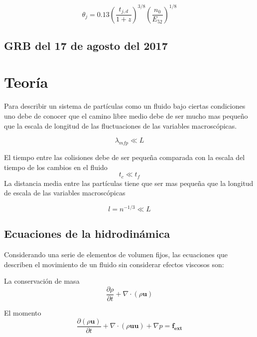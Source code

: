 \documentclass[12pt,a4paper]{book}
\begin{document}
\begin{equation}
\theta_j = 0.13 \left( \frac{t_{j,d}}{1+z} \right)^{3/8}
\left(\frac{n_0}{E_{52}} \right)^{1/8}
\end{equation}

\section{GRB del 17 de agosto del 2017}
%
\chapter{Teoría}
Para describir un sistema de partículas como un fluido bajo ciertas condiciones uno debe de conocer que el camino libre medio debe de ser mucho mas pequeño que la escala de longitud de las fluctuaciones de las variables macroscópicas.

\begin{equation}
\lambda_{mfp} \ll L
\end{equation}

El tiempo entre las colisiones debe de ser pequeña comparada con la escala del tiempo de los cambios en el fluido
\begin{equation}
t_{c} \ll t_f
\end{equation}
La distancia media entre las partículas tiene que ser mas pequeña que la longitud de escala de las variables macroscópicas

\begin{equation}
l = n^{-1/3} \ll L
\end{equation}



\section{Ecuaciones de la hidrodinámica}

Considerando una serie de elementos de volumen fijos, las ecuaciones que describen el movimiento de un fluido sin considerar efectos viscosos son:

La conservación de masa
\begin{equation} \label{conservación_masa_hidrodinamica}
\dfrac{\partial \rho }{\partial t} + \nabla \cdot \left( \rho \mathbf{u} \right)
\end{equation}

El momento
\begin{equation}  \label{conservacion_momento_hidrodinamica}
\dfrac{\partial \left( \rho \mathbf{u} \right) }{\partial t}+ \nabla \cdot \left( \rho \mathbf{u u} \right) + \nabla p = \mathbf{f_{ext}}
\end{equation}
\end{document}
